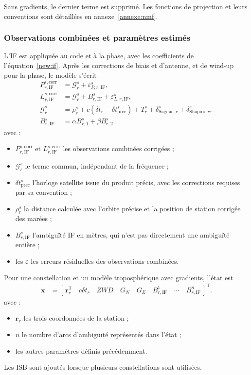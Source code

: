 Sans gradients, le dernier terme est supprimé. Les fonctions de projection
et leurs conventions sont détaillées en annexe~\ref{annexe:nmf}.

\subsubsection{Observations combinées et paramètres estimés}

L'IF est appliquée au code et à la phase, avec les coefficients de
l'équation~\eqref{new:if}. Après les corrections de biais et d'antenne, et de
wind-up pour la phase, le modèle s'écrit
\begin{align}
P_{r,\mathrm{IF}}^{s,\mathrm{corr}}&=
\mathcal G_r^s+\varepsilon_{P,r,\mathrm{IF}}^s,\\
L_{r,\mathrm{IF}}^{s,\mathrm{corr}}&=
\mathcal G_r^s+B_{r,\mathrm{IF}}^s+\varepsilon_{L,r,\mathrm{IF}}^s,\\
\mathcal G_r^s&=\rho_r^s+c(\delta t_r-\delta t_{\mathrm{prec}}^s)
+T_r^s+\delta_{\mathrm{Sagnac},r}^s+\delta_{\mathrm{Shapiro},r}^s,\\
B_{r,\mathrm{IF}}^s&=\alpha B_{r,1}^s+\beta B_{r,2}^s.
\label{new:ppp_model}
\end{align}
avec :
\begin{itemize}
\item $P_{r,\mathrm{IF}}^{s,\mathrm{corr}}$ et
$L_{r,\mathrm{IF}}^{s,\mathrm{corr}}$ les observations combinées corrigées ;
\item $\mathcal G_r^s$ le terme commun, indépendant de la fréquence ;
\item $\delta t_{\mathrm{prec}}^s$ l'horloge satellite issue du produit précis,
avec les corrections requises par sa convention ;
\item $\rho_r^s$ la distance calculée avec l'orbite précise et la position de
station corrigée des marées ;
\item $B_{r,\mathrm{IF}}^s$ l'ambiguïté IF en mètres, qui n'est pas directement
une ambiguïté entière ;
\item les $\varepsilon$ les erreurs résiduelles des observations combinées.
\end{itemize}

Pour une constellation et un modèle troposphérique avec gradients, l'état est
\begin{align}
\mathbf x&=[\,\mathbf r_r^{\mathsf T}\quad c\delta t_r\quad ZWD\quad
G_N\quad G_E\quad B_{r,\mathrm{IF}}^1\quad\cdots\quad
B_{r,\mathrm{IF}}^n\,]^{\mathsf T}.
\label{new:ppp_state}
\end{align}
avec :
\begin{itemize}
\item $\mathbf r_r$ les trois coordonnées de la station ;
\item $n$ le nombre d'arcs d'ambiguïté représentés dans l'état ;
\item les autres paramètres définis précédemment.
\end{itemize}
Les ISB sont ajoutés lorsque plusieurs constellations sont utilisées.

